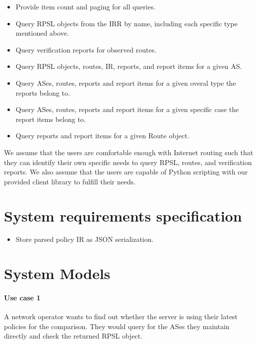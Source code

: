 \documentclass[12pt]{article}
\begin{document}
\begin{itemize}
    \item Provide item count and paging for all queries.
    \item Query RPSL objects from the IRR by name,
    including each specific type mentioned above.
    \item Query verification reports for observed routes.
    \item Query RPSL objects, routes, IR, reports,
    and report items for a given AS.
    \item Query ASes, routes, reports and report items for a given
    overal type the reports belong to.
    \item Query ASes, routes, reports and report items for a given
    specific case the report items belong to.
    \item Query reports and report items for a given Route object.
\end{itemize}



We assume that the users are comfortable enough with Internet routing
such that they can identify their own specific needs to
query RPSL, routes, and verification reports.
We also assume that the users are capable of Python scripting with
our provided client library to fulfill their needs.

\section{System requirements specification }
\begin{itemize}
    \item Store parsed policy IR as JSON serialization.
\end{itemize}

\section{System Models}
\paragraph{Use case 1}
A network operator wants to find out whether the server is
using their latest policies for the comparison.
They would query for the ASes they maintain directly and
check the returned RPSL object.
\end{document}
